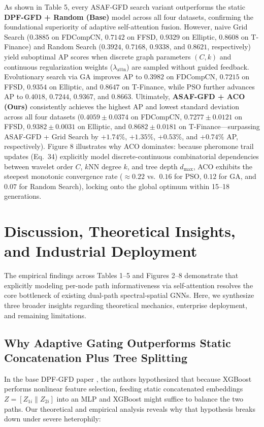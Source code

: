 \documentclass[10pt,a4paper,twocolumn]{article}
\begin{document}
As shown in Table 5, every ASAF-GFD search variant outperforms the static \textbf{DPF-GFD + Random (Base)} model across all four datasets, confirming the foundational superiority of adaptive self-attention fusion. However, naive Grid Search ($0.3885$ on FDCompCN, $0.7142$ on FFSD, $0.9329$ on Elliptic, $0.8608$ on T-Finance) and Random Search ($0.3924$, $0.7168$, $0.9338$, and $0.8621$, respectively) yield suboptimal AP scores when discrete graph parameters $(C, k)$ and continuous regularization weights ($\lambda_{\text{attn}}$) are sampled without guided feedback. Evolutionary search via GA improves AP to $0.3982$ on FDCompCN, $0.7215$ on FFSD, $0.9354$ on Elliptic, and $0.8647$ on T-Finance, while PSO further advances AP to $0.4018$, $0.7244$, $0.9367$, and $0.8663$. Ultimately, \textbf{ASAF-GFD + ACO (Ours)} consistently achieves the highest AP and lowest standard deviation across all four datasets ($\mathbf{0.4059 \pm 0.0374}$ on FDCompCN, $\mathbf{0.7277 \pm 0.0121}$ on FFSD, $\mathbf{0.9382 \pm 0.0031}$ on Elliptic, and $\mathbf{0.8682 \pm 0.0181}$ on T-Finance---surpassing ASAF-GFD + Grid Search by $+1.74\%$, $+1.35\%$, $+0.53\%$, and $+0.74\%$ AP, respectively). Figure 8 illustrates why ACO dominates: because pheromone trail updates (Eq.\ 34) explicitly model discrete-continuous combinatorial dependencies between wavelet order $C$, $k$NN degree $k$, and tree depth $d_{\max}$, ACO exhibits the steepest monotonic convergence rate ($\approx 0.22$ vs.\ $0.16$ for PSO, $0.12$ for GA, and $0.07$ for Random Search), locking onto the global optimum within 15--18 generations.

\section{Discussion, Theoretical Insights, and Industrial Deployment}

The empirical findings across Tables 1--5 and Figures 2--8 demonstrate that explicitly modeling per-node path informativeness via self-attention resolves the core bottleneck of existing dual-path spectral-spatial GNNs. Here, we synthesize three broader insights regarding theoretical mechanics, enterprise deployment, and remaining limitations.

\subsection{Why Adaptive Gating Outperforms Static Concatenation Plus Tree Splitting}

In the base DPF-GFD paper \cite{ref9}, the authors hypothesized that because XGBoost performs nonlinear feature selection, feeding static concatenated embeddings $Z = [Z_{1i} \parallel Z_{2i}]$ into an MLP and XGBoost might suffice to balance the two paths. Our theoretical and empirical analysis reveals why that hypothesis breaks down under severe heterophily:
\end{document}
